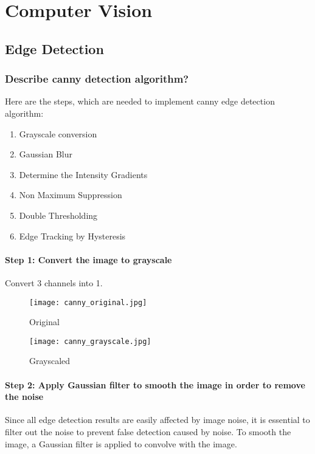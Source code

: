 \chapter{   Computer Vision}
\graphicspath{{./images/computer_vision/}}

\section{Edge Detection}


\subsection{Describe canny detection algorithm?}
Here are the steps, which are needed to implement canny edge detection algorithm:
\begin{enumerate}
    \item Grayscale conversion
    \item Gaussian Blur
    \item Determine the Intensity Gradients
    \item Non Maximum Suppression
    \item Double Thresholding
    \item Edge Tracking by Hysteresis
\end{enumerate}

\subsubsection{Step 1: Convert the image to grayscale}
Convert 3 channels into 1.

\begin{figure}[!htb]
    \centering
    \begin{minipage}{.5\textwidth}
        \centering
        \texttt{[image: canny\_original.jpg]}
        \caption{Original}
    \end{minipage}%
    \begin{minipage}{.5\textwidth}
        \centering
        \texttt{[image: canny\_grayscale.jpg]}
        \caption{Grayscaled}
    \end{minipage}
\end{figure}


\subsubsection{Step 2: Apply Gaussian filter to smooth the image in order to remove the noise}
Since all edge detection results are easily affected by image noise, it is essential to filter out the noise to prevent false detection caused by noise. To smooth the image, a Gaussian filter is applied to convolve with the image.

